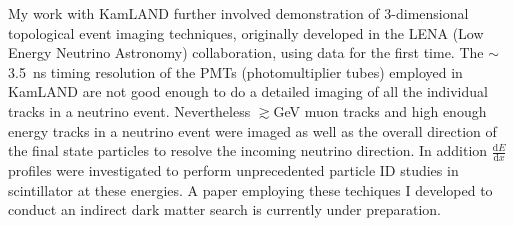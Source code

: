 \documentclass[10pt]{article} %
\begin{document}
My work with KamLAND further involved demonstration of 3-dimensional
topological event imaging techniques, originally developed in the LENA (Low
Energy Neutrino Astronomy) collaboration, using data for the first time. The
$\sim$\SI{3.5}{\nano\second} timing resolution of the PMTs (photomultiplier
tubes) employed in KamLAND are not good enough to do a detailed imaging of all
the individual tracks in a neutrino event. Nevertheless
$\gtrsim$\si{\giga\electronvolt} muon tracks and high enough energy tracks in a
neutrino event were imaged as well as the overall direction of the final state
particles to resolve the incoming neutrino direction. In addition
$\frac{\mathrm{d}E}{\mathrm{d}x}$ profiles were investigated to perform
unprecedented particle ID studies in scintillator at these energies. A paper
employing these techiques I developed to conduct an indirect dark matter search
is currently under preparation.


\end{document}
